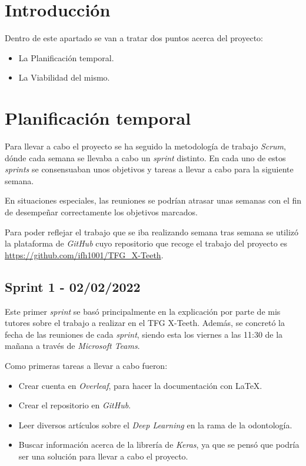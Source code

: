 
\section{Introducción}
Dentro de este apartado se van a tratar dos puntos acerca del proyecto:
\begin{itemize}
    \item La Planificación temporal.
    \item La Viabilidad del mismo.
\end{itemize}
\section{Planificación temporal}
Para llevar a cabo el proyecto se ha seguido la metodología de trabajo \emph{Scrum}, dónde cada semana se llevaba a cabo un \emph{sprint} distinto. En cada uno de estos \emph{sprints} se consensuaban unos objetivos y tareas a llevar a cabo para la siguiente semana.

En situaciones especiales, las reuniones se podrían atrasar unas semanas con el fin de desempeñar correctamente los objetivos marcados.

Para poder reflejar el trabajo que se iba realizando semana tras semana se utilizó la plataforma de \emph{GitHub} cuyo repositorio que recoge el trabajo del proyecto es \url{https://github.com/ifh1001/TFG_X-Teeth}.

\subsection{Sprint 1 - 02/02/2022}
Este primer \emph{sprint} se basó principalmente en la explicación por parte de mis tutores sobre el trabajo a realizar en el TFG X-Teeth. Además, se concretó la fecha de las reuniones de cada \emph{sprint}, siendo esta los viernes a las 11:30 de la mañana a través de \emph{Microsoft Teams}.

Como primeras tareas a llevar a cabo fueron:
\begin{itemize}
    \item Crear cuenta en \emph{Overleaf}, para hacer la documentación con \LaTeX.
    \item Crear el repositorio en \emph{GitHub}.
    \item Leer diversos artículos sobre el \emph{Deep Learning} en la rama de la odontología.
    \item Buscar información acerca de la librería de \emph{Keras}, ya que se pensó que podría ser una solución para llevar a cabo el proyecto.
\end{itemize}
